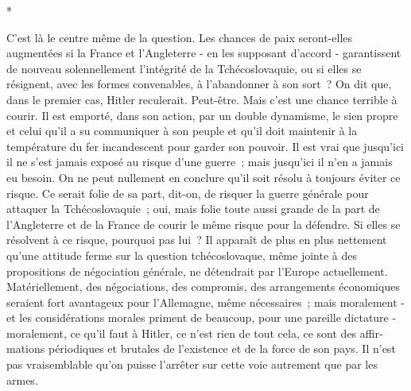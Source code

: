 \documentclass[french,twoside]{book} %
\begin{document}
\begin{center}
*\end{center}
\noindent C'est là le centre même de la question. Les chances de paix seront-elles augmentées si la France et l'Angleterre - en les supposant d'accord - garantissent de nouveau solennellement l'intégrité de la Tchécoslovaquie, ou si elles se résignent, avec les formes convenables, à l'abandonner à son sort ? On dit que, dans le premier cas, Hitler reculerait. Peut-être. Mais c'est une chance terrible à courir. Il est emporté, dans son action, par un double dynamisme, le sien propre et celui qu'il a su communiquer à son peuple et qu'il doit maintenir à la température du fer incandescent pour garder son pouvoir. Il est vrai que jusqu'ici il ne s'est jamais exposé au risque d'une guerre ; mais jusqu'ici il n'en a jamais eu besoin. On ne peut nullement en conclure qu'il soit résolu à toujours éviter ce risque. Ce serait folie de sa part, dit-on, de risquer la guerre générale pour attaquer la Tchécoslovaquie ; oui, mais folie toute aussi grande de la part de l'Angleterre et de la France de courir le même risque pour la défendre. Si elles se résolvent à ce risque, pourquoi pas lui ? Il apparaît de plus en plus nettement qu'une attitude ferme sur la question tchécoslovaque, même jointe à des propositions de négociation générale, ne détendrait par l'Europe actuellement. Matériellement, des négo­ciations, des compromis, des arrangements économiques seraient fort avantageux pour l'Allemagne, même nécessaires ; mais moralement - et les considérations morales priment de beaucoup, pour une pareille dictature - moralement, ce qu'il faut à Hitler, ce n'est rien de tout cela, ce sont des affir­mations périodiques et brutales de l'existence et de la force de son pays. Il n'est pas vraisemblable qu'on puisse l'arrêter sur cette voie autrement que par les armes.\par
\end{document}
